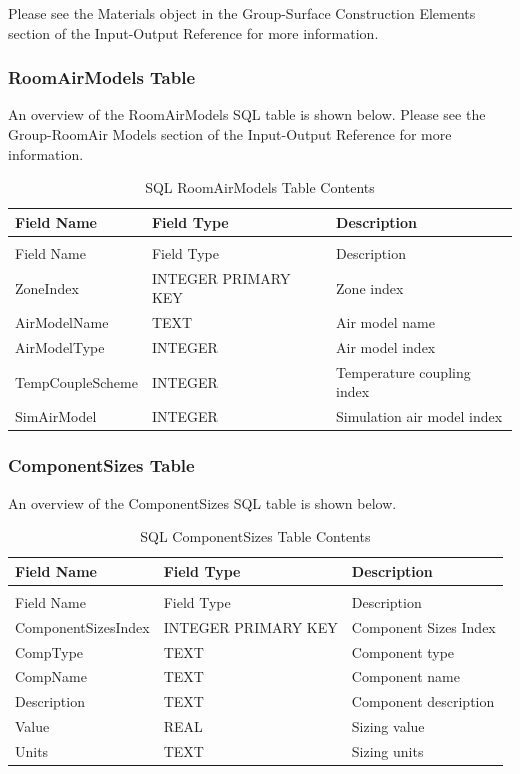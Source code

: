 Please see the Materials object in the Group-Surface Construction Elements section of the Input-Output Reference for more information.

\subsubsection{RoomAirModels Table}

An overview of the RoomAirModels SQL table is shown below. Please see the Group-RoomAir Models section of the Input-Output Reference for more information.

\begin{longtable}[c]{@{}lll@{}}
\caption{SQL RoomAirModels Table Contents \label{table:table-29.-sql-roomairmodels-table-contents}} \tabularnewline
\toprule
Field Name & Field Type & Description \tabularnewline
\midrule
\endfirsthead

\caption[]{SQL RoomAirModels Table Contents} \tabularnewline
\toprule
Field Name & Field Type & Description \tabularnewline
\midrule
\endhead

ZoneIndex & INTEGER PRIMARY KEY & Zone index \tabularnewline
AirModelName & TEXT & Air model name \tabularnewline
AirModelType & INTEGER & Air model index \tabularnewline
TempCouple\-Scheme & INTEGER & Temperature coupling index \tabularnewline
SimAirModel & INTEGER & Simulation air model index \tabularnewline
\bottomrule
\end{longtable}

\subsubsection{ComponentSizes Table}

An overview of the ComponentSizes SQL table is shown below.

\begin{longtable}[c]{@{}lll@{}}
\caption{SQL ComponentSizes Table Contents \label{table:table-30.-sql-componentsizes-table-contents}} \tabularnewline
\toprule
Field Name & Field Type & Description \tabularnewline
\midrule
\endfirsthead

\caption[]{SQL ComponentSizes Table Contents} \tabularnewline
\toprule
Field Name & Field Type & Description \tabularnewline
\midrule
\endhead

Component\-Sizes\-Index & INTEGER PRIMARY KEY & Component Sizes Index \tabularnewline
CompType & TEXT & Component type \tabularnewline
CompName & TEXT & Component name \tabularnewline
Description & TEXT & Component description \tabularnewline
Value & REAL & Sizing value \tabularnewline
Units & TEXT & Sizing units \tabularnewline
\bottomrule
\end{longtable}

